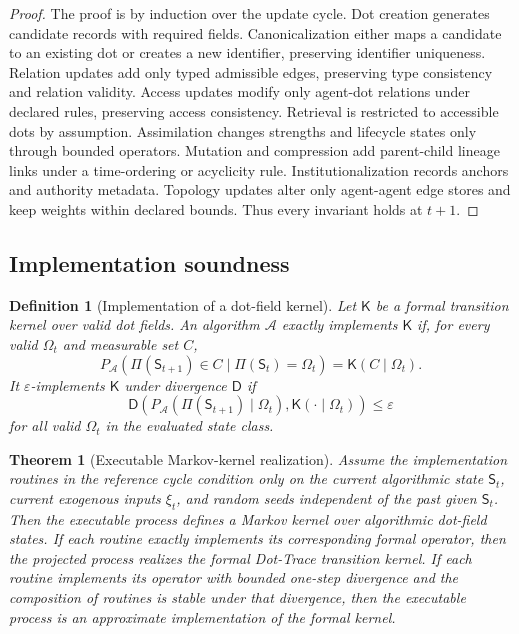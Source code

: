 \documentclass[11pt]{article}
\newtheorem{definition}{Definition}
\newtheorem{theorem}{Theorem}
\theoremstyle{remark}
\begin{document}
\begin{proof}
The proof is by induction over the update cycle. Dot creation generates
candidate records with required fields. Canonicalization either maps a
candidate to an existing dot or creates a new identifier, preserving
identifier uniqueness. Relation updates add only typed admissible edges,
preserving type consistency and relation validity. Access updates modify
only agent-dot relations under declared rules, preserving access
consistency. Retrieval is restricted to accessible dots by assumption.
Assimilation changes strengths and lifecycle states only through bounded
operators. Mutation and compression add parent-child lineage links under
a time-ordering or acyclicity rule. Institutionalization records anchors
and authority metadata. Topology updates alter only agent-agent edge
stores and keep weights within declared bounds. Thus every invariant
holds at $t+1$.
\end{proof}

\subsection{Implementation soundness}\label{implementation-soundness}

\begin{definition}[Implementation of a dot-field kernel]\label{def:kernel-implementation}
Let $\mathsf K$ be a formal transition kernel over valid dot fields. An
algorithm $\mathcal A$ exactly implements $\mathsf K$ if, for every valid
$\Omega_t$ and measurable set $C$,
$$
P_{\mathcal A}(\Pi(\mathsf S_{t+1})\in C\mid \Pi(\mathsf S_t)=\Omega_t)
=\mathsf K(C\mid \Omega_t).
$$
It $\varepsilon$-implements $\mathsf K$ under divergence $\mathsf D$ if
$$
\mathsf D\left(P_{\mathcal A}(\Pi(\mathsf S_{t+1})\mid\Omega_t),
\mathsf K(\cdot\mid\Omega_t)\right)\leq\varepsilon
$$
for all valid $\Omega_t$ in the evaluated state class.
\end{definition}

\begin{theorem}[Executable Markov-kernel realization]\label{thm:executable-markov-kernel-realization}
Assume the implementation routines in the reference cycle condition only
on the current algorithmic state $\mathsf S_t$, current exogenous inputs
$\xi_t$, and random seeds independent of the past given $\mathsf S_t$.
Then the executable process defines a Markov kernel over algorithmic
dot-field states. If each routine exactly implements its corresponding
formal operator, then the projected process realizes the formal
Dot-Trace transition kernel. If each routine implements its operator with
bounded one-step divergence and the composition of routines is stable
under that divergence, then the executable process is an approximate
implementation of the formal kernel.
\end{theorem}
\end{document}
